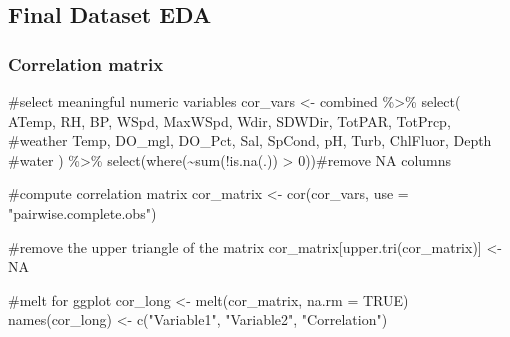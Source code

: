 \documentclass[
  letterpaper,
  DIV=11,
  numbers=noendperiod]{scrartcl}
\newenvironment{Shaded}{\begin{snugshade}}{\end{snugshade}}
\newcommand{\AttributeTok}[1]{\textcolor[rgb]{0.40,0.45,0.13}{#1}}
\newcommand{\CommentTok}[1]{\textcolor[rgb]{0.37,0.37,0.37}{#1}}
\newcommand{\ConstantTok}[1]{\textcolor[rgb]{0.56,0.35,0.01}{#1}}
\newcommand{\DecValTok}[1]{\textcolor[rgb]{0.68,0.00,0.00}{#1}}
\newcommand{\FunctionTok}[1]{\textcolor[rgb]{0.28,0.35,0.67}{#1}}
\newcommand{\NormalTok}[1]{\textcolor[rgb]{0.00,0.23,0.31}{#1}}
\newcommand{\OtherTok}[1]{\textcolor[rgb]{0.00,0.23,0.31}{#1}}
\newcommand{\SpecialCharTok}[1]{\textcolor[rgb]{0.37,0.37,0.37}{#1}}
\newcommand{\StringTok}[1]{\textcolor[rgb]{0.13,0.47,0.30}{#1}}
\begin{document}
\subsection{Final Dataset EDA}\label{final-dataset-eda}

\subsubsection{Correlation matrix}\label{correlation-matrix}

\begin{Shaded}
\begin{Highlighting}[]
\CommentTok{\#select meaningful numeric variables}
\NormalTok{cor\_vars }\OtherTok{\textless{}{-}}\NormalTok{ combined }\SpecialCharTok{\%\textgreater{}\%}
  \FunctionTok{select}\NormalTok{(}
\NormalTok{    ATemp, RH, BP, WSpd, MaxWSpd, Wdir, SDWDir, TotPAR, TotPrcp,  }\CommentTok{\#weather}
\NormalTok{    Temp, DO\_mgl, DO\_Pct, Sal, SpCond, pH, Turb, ChlFluor, Depth   }\CommentTok{\#water}
\NormalTok{  ) }\SpecialCharTok{\%\textgreater{}\%}
  \FunctionTok{select}\NormalTok{(}\FunctionTok{where}\NormalTok{(}\SpecialCharTok{\textasciitilde{}}\FunctionTok{sum}\NormalTok{(}\SpecialCharTok{!}\FunctionTok{is.na}\NormalTok{(.)) }\SpecialCharTok{\textgreater{}} \DecValTok{0}\NormalTok{))}\CommentTok{\#remove NA columns}

\CommentTok{\#compute correlation matrix}
\NormalTok{cor\_matrix }\OtherTok{\textless{}{-}} \FunctionTok{cor}\NormalTok{(cor\_vars, }\AttributeTok{use =} \StringTok{"pairwise.complete.obs"}\NormalTok{)}

\CommentTok{\#remove the upper triangle of the matrix}
\NormalTok{cor\_matrix[}\FunctionTok{upper.tri}\NormalTok{(cor\_matrix)] }\OtherTok{\textless{}{-}} \ConstantTok{NA}

\CommentTok{\#melt for ggplot}
\NormalTok{cor\_long }\OtherTok{\textless{}{-}} \FunctionTok{melt}\NormalTok{(cor\_matrix, }\AttributeTok{na.rm =} \ConstantTok{TRUE}\NormalTok{)}
\FunctionTok{names}\NormalTok{(cor\_long) }\OtherTok{\textless{}{-}} \FunctionTok{c}\NormalTok{(}\StringTok{"Variable1"}\NormalTok{, }\StringTok{"Variable2"}\NormalTok{, }\StringTok{"Correlation"}\NormalTok{)}



\end{Highlighting}
\end{Shaded}
\end{document}
